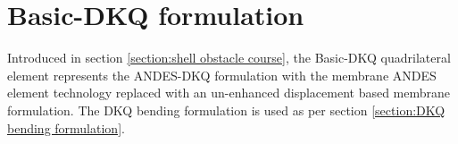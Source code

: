 
\chapter{Basic-DKQ formulation}
\label{sec:Basic-DKQ quadrilateral formulation}
\renewcommand{\Thema}{Basic-DKQ quadrilateral formulation}

Introduced in section \ref{section:shell obstacle course}, the Basic-DKQ quadrilateral element represents the ANDES-DKQ formulation with the membrane ANDES element technology replaced with an un-enhanced displacement based membrane formulation. The DKQ bending formulation is used as per section \ref{section:DKQ bending formulation}.

